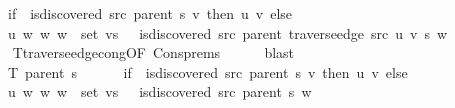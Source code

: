 \begin{isabellebody}
\ \ \ \ \ {\isacharparenleft}{\kern0pt}if\ {\isasymnot}\ is{\isacharunderscore}{\kern0pt}discovered\ src\ {\isacharparenleft}{\kern0pt}parent\ s{\isacharparenright}{\kern0pt}\ v\ then\ {\isacharbraceleft}{\kern0pt}{\isacharparenleft}{\kern0pt}u{\isacharcomma}{\kern0pt}\ v{\isacharparenright}{\kern0pt}{\isacharbraceright}{\kern0pt}\ else\ {\isacharbraceleft}{\kern0pt}{\isacharbraceright}{\kern0pt}{\isacharparenright}{\kern0pt}\ {\isasymunion}\isanewline
\ \ \ \ \ {\isacharbraceleft}{\kern0pt}{\isacharparenleft}{\kern0pt}u{\isacharcomma}{\kern0pt}\ w{\isacharparenright}{\kern0pt}\ {\isacharbar}{\kern0pt}w{\isachardot}{\kern0pt}\ w\ {\isasymin}\ set\ vs\ {\isasymand}\ {\isasymnot}\ is{\isacharunderscore}{\kern0pt}discovered\ src\ {\isacharparenleft}{\kern0pt}parent\ {\isacharparenleft}{\kern0pt}traverse{\isacharunderscore}{\kern0pt}edge\ src\ u\ v\ s{\isacharparenright}{\kern0pt}{\isacharparenright}{\kern0pt}\ w{\isacharbraceright}{\kern0pt}{\isachardoublequoteclose}\isanewline
\ \ \ \ \isamarkupfalse%
\ T{\isacharunderscore}{\kern0pt}traverse{\isacharunderscore}{\kern0pt}edge{\isacharunderscore}{\kern0pt}cong{\isacharbrackleft}{\kern0pt}OF\ Cons{\isachardot}{\kern0pt}prems{\isacharparenleft}{\kern0pt}{}{\isacharparenright}{\kern0pt}{\isacharbrackright}{\kern0pt}\isanewline
\ \ \ \ \isamarkupfalse%
\ blast\isanewline
\ \ \isamarkupfalse%
\ \isamarkupfalse%
\isanewline
\ \ \ \ {\isachardoublequoteopen}{\isachardot}{\kern0pt}{\isachardot}{\kern0pt}{\isachardot}{\kern0pt}\ {\isacharequal}{\kern0pt}\isanewline
\ \ \ \ \ T\ {\isacharparenleft}{\kern0pt}parent\ s{\isacharparenright}{\kern0pt}\ {\isasymunion}\isanewline
\ \ \ \ \ {\isacharparenleft}{\kern0pt}if\ {\isasymnot}\ is{\isacharunderscore}{\kern0pt}discovered\ src\ {\isacharparenleft}{\kern0pt}parent\ s{\isacharparenright}{\kern0pt}\ v\ then\ {\isacharbraceleft}{\kern0pt}{\isacharparenleft}{\kern0pt}u{\isacharcomma}{\kern0pt}\ v{\isacharparenright}{\kern0pt}{\isacharbraceright}{\kern0pt}\ else\ {\isacharbraceleft}{\kern0pt}{\isacharbraceright}{\kern0pt}{\isacharparenright}{\kern0pt}\ {\isasymunion}\isanewline
\ \ \ \ \ {\isacharbraceleft}{\kern0pt}{\isacharparenleft}{\kern0pt}u{\isacharcomma}{\kern0pt}\ w{\isacharparenright}{\kern0pt}\ {\isacharbar}{\kern0pt}w{\isachardot}{\kern0pt}\ w\ {\isasymin}\ set\ vs\ {\isasymand}\ {\isasymnot}\ is{\isacharunderscore}{\kern0pt}discovered\ src\ {\isacharparenleft}{\kern0pt}parent\ s{\isacharparenright}{\kern0pt}\ w{\isacharbraceright}{\kern0pt}{\isachardoublequoteclose}\isanewline
\ \ \ \ \isamarkupfalse%

\end{isabellebody}
